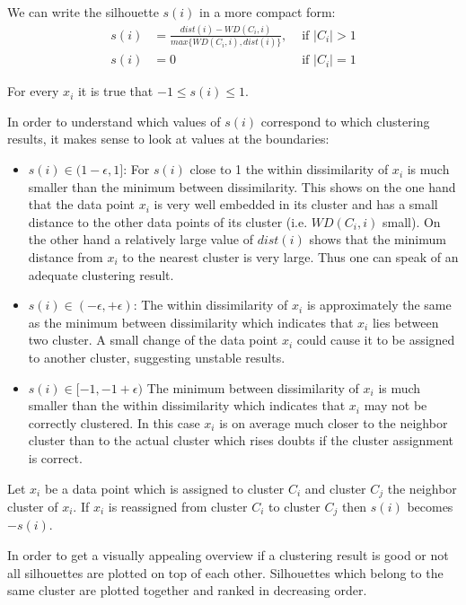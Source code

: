 \begin{remark}
	We can write the silhouette $s(i)$ in a more compact form: 
	\begin{align*}
		s(i) &= \frac{dist(i) - WD(C_i,i)}{max\{ WD(C_i,i), dist(i) \}},  &\text{ if } |C_i|>1 \\
		s(i) &= 0  &\text{ if } |C_i|=1
	\end{align*}
\end{remark}

\begin{remark}
	For every $x_i$ it is true that $-1 \leq s(i) \leq 1$.
\end{remark}

\begin{remark}
	In order to understand which values of $s(i)$ correspond to which clustering results, it makes sense to look at values at the boundaries: 
	\begin{itemize}%
		\item $s(i) \in (1 - \epsilon, 1]$: For $s(i)$ close to 1 the within dissimilarity of $x_i$ is much smaller than the minimum between dissimilarity. This shows on the one hand that the data point $x_i$ is very well embedded in its cluster and has a small distance to the other data points of its cluster (i.e. $WD(C_i,i)$ small). On the other hand a relatively large value of $dist(i)$ shows that the minimum distance from $x_i$ to the nearest cluster is very large. Thus one can speak of an adequate clustering result.		
		\item $s(i) \in (-\epsilon, + \epsilon)$: The within dissimilarity of $x_i$ is approximately the same as the minimum between dissimilarity which indicates that $x_i$ lies between two cluster. A small change of the data point $x_i$ could cause it to be assigned to another cluster, suggesting unstable results.		
		\item $s(i) \in [-1, -1 + \epsilon)$ The minimum between dissimilarity of $x_i$ is much smaller than the within dissimilarity which indicates that $x_i$ may not be correctly clustered. In this case $x_i$ is on average much closer to the neighbor cluster than to the actual cluster which rises doubts if the cluster assignment is correct. 
	\end{itemize}
\end{remark}

\begin{remark}	
	Let $x_i$ be a data point which is assigned to cluster $C_i$ and cluster $C_j$ the neighbor cluster of $x_i$. If $x_i$ is reassigned from cluster $C_i$ to cluster $C_j$ then $s (i)$ becomes $-s(i)$.
\end{remark}
In order to get a visually appealing overview if a clustering result is good or not all silhouettes are plotted on top of each other. Silhouettes which belong to the same cluster are plotted together and ranked in decreasing order.

